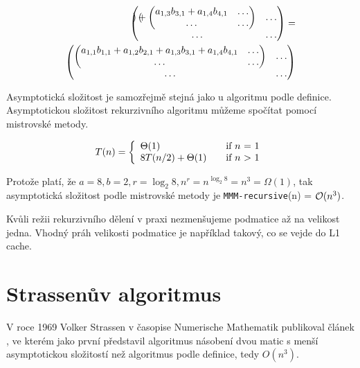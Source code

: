 \begin{align}
\begin{pmatrix}
\begin{pmatrix}
\end{pmatrix} + 
\begin{pmatrix}
 a_{1,3} b_{3,1}+a_{1,4} b_{4,1} & \hdots \\
 \hdots & \hdots
\end{pmatrix} &
\hdots \notag\\
\hdots & \hdots
\end{pmatrix} = \notag\\
\begin{pmatrix}
\begin{pmatrix}
 a_{1,1} b_{1,1}+a_{1,2} b_{2,1}+a_{1,3} b_{3,1}+a_{1,4} b_{4,1} & \hdots \\
\hdots & \hdots
\end{pmatrix} &
\hdots \\\hdots & \hdots
\end{pmatrix} \notag
\end{align}

Asymptotická složitost je samozřejmě stejná jako u algoritmu podle definice. Asymptotickou složitost rekurzivního algoritmu můžeme spočítat pomocí mistrovské metody.

\[ T(n) = \left\{ 
  \begin{array}{l l}
    \Theta(1) & \quad \text{if $n$ = 1}\\
    8T(n/2) + \Theta(1) & \quad \text{if $n$ > 1}
  \end{array} \right.\]

Protože platí, že $a=8, b=2, r=\log_{2} 8, n^r=n^{\log_{2} 8}=n^3=\Omega(1)$, tak asymptotická složitost podle mistrovské metody je \texttt{MMM-recursive}(n) = $\mathcal{O}(n^3)$.

Kvůli režii rekurzivního dělení v praxi nezmenšujeme podmatice až na velikost jedna. Vhodný práh velikosti podmatice je například takový, co se vejde do L1 cache.

\section{Strassenův algoritmus} %

V roce 1969 Volker Strassen v časopise Numerische Mathematik publikoval článek \cite{GEMnO}, ve kterém jako první představil algoritmus násobení dvou matic s menší asymptotickou složitostí než algoritmus podle definice, tedy $O(n^3)$.

